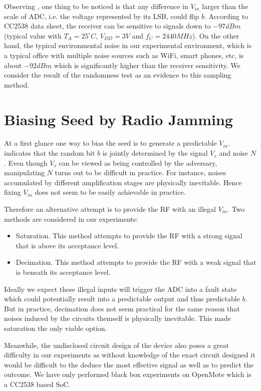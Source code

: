 Observing , one thing to be noticed is that any difference in $V_{in}$ larger than the scale of ADC, i.e. the voltage represented by its LSB, could flip $b$. According to CC2538 data sheet\cite{CC2538Datasheet}, the receiver can be sensitive to signals down to $-97dBm$ (typical value with $T_A = 25^{\circ}C$, $V_{DD} = 3V$ and $f_{C} = 2440MHz$). On the other hand, the typical environmental noise in our experimental environment, which is a typical office with multiple noise sources such as  WiFi, smart phones, etc, is about $-92dBm$ which is significantly higher than the receiver sensitivity. We consider the result of the randomness test as an evidence to this sampling method.

\section{Biasing Seed by Radio Jamming}\label{Jamming}
At a first glance one way to bias the seed is to generate a predictable $V_{in}$.  indicates that the random bit $b$ is jointly determined by the signal $V_s$ and noise $N$. Even though $V_s$ can be viewed as being controlled by the adversary, manipulating $N$ turns out to be difficult in practice. For instance, noises accumulated by different amplification stages are physically inevitable. Hence fixing $V_{in}$ does not seem to be easily achievable in practice.

Therefore an alternative attempt is to provide the RF with an illegal $V_{in}$. Two methods are considered in our experiments:
\begin{itemize}
	\item Saturation. This method attempts to provide the RF with a strong signal that is above its acceptance level.
	\item Decimation. This method attempts to provide the RF with a weak signal that is beneath its acceptance level.
\end{itemize}

Ideally we expect these illegal inputs will trigger the ADC into a fault state which could potentially result into a predictable output and thus predictable $b$. But in practice, decimation does not seem practical for the same reason that noises induced by the circuits themself is physically inevitable. This made saturation the only viable option.

Meanwhile, the undisclosed circuit design of the device also poses a great difficulty in our experiments as without knowledge of the exact circuit designed it would be difficult to the deduce the most effective signal as well as to predict the outcome. We have only performed black box experiments on OpenMote\cite{OpenMote} which is a CC2538 based SoC.

